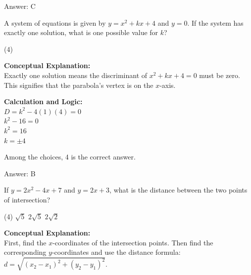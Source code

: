 \documentclass[11pt,paper=a4,answers]{exam}
\begin{document}
\begin{questions}
\begin{solution}
\vspace{25pt}

Answer: \colorbox{yellow!100}{C}
\end{solution}

\vspace{40pt}

\question
A system of equations is given by $y = x^2 + kx + 4$ and $y = 0$. If the system has exactly one solution, what is one possible value for $k$?
\begin{tasks}(4)
\end{tasks}

\begin{solution}
\textbf{Conceptual Explanation:} \\
Exactly one solution means the discriminant of $x^2 + kx + 4 = 0$ must be zero. This signifies that the parabola's vertex is on the $x$-axis.

\vspace{20pt}

\textbf{Calculation and Logic:} \\
$D = k^2 - 4(1)(4) = 0$ \\
$k^2 - 16 = 0$ \\
$k^2 = 16$ \\
$k = \pm 4$

\vspace{10pt}

Among the choices, 4 is the correct answer.

\vspace{25pt}

Answer: \colorbox{yellow!100}{B}
\end{solution}

\vspace{40pt}

\question
If $y = 2x^2 - 4x + 7$ and $y = 2x + 3$, what is the distance between the two points of intersection?
\begin{tasks}(4)
    \task $\sqrt{5}$
    \task $2\sqrt{5}$
    \task $2\sqrt{2}$
\end{tasks}

\begin{solution}
\textbf{Conceptual Explanation:} \\
First, find the $x$-coordinates of the intersection points. Then find the corresponding $y$-coordinates and use the distance formula: $d = \sqrt{(x_2-x_1)^2 + (y_2-y_1)^2}$.


\end{solution}
\end{questions}
\end{document}
